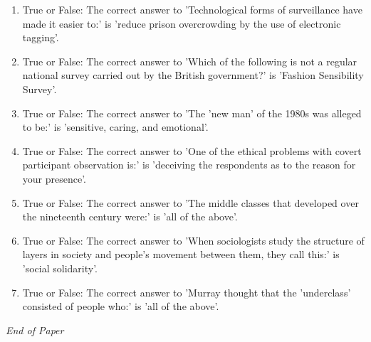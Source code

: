 \documentclass[12pt]{article}
\begin{document}
\begin{enumerate}[label=\arabic*.]
\item True or False: The correct answer to 'Technological forms of surveillance have made it easier to:' is 'reduce prison overcrowding by the use of electronic tagging'.
\item True or False: The correct answer to 'Which of the following is not a regular national survey carried out by the British government?' is 'Fashion Sensibility Survey'.
\item True or False: The correct answer to 'The 'new man' of the 1980s was alleged to be:' is 'sensitive, caring, and emotional'.
\item True or False: The correct answer to 'One of the ethical problems with covert participant observation is:' is 'deceiving the respondents as to the reason for your presence'.
\item True or False: The correct answer to 'The middle classes that developed over the nineteenth century were:' is 'all of the above'.
\item True or False: The correct answer to 'When sociologists study the structure of layers in society and people's movement between them, they call this:' is 'social solidarity'.
\item True or False: The correct answer to 'Murray thought that the 'underclass' consisted of people who:' is 'all of the above'.
\end{enumerate}

\vfill
\noindent\textit{End of Paper}
\end{document}
